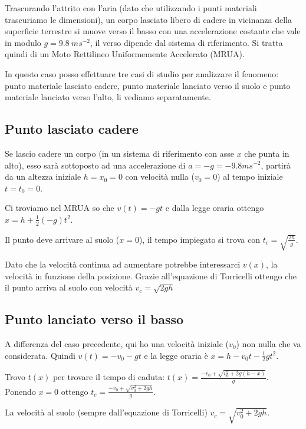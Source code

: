 \documentclass[class=book, crop=false, oneside, 12pt]{standalone}
\begin{document}
Trascurando l'attrito con l'aria (dato che utilizzando i punti materiali
trascuriamo le dimensioni), un corpo lasciato libero di cadere in
vicinanza della superficie terrestre si muove verso il basso con una
accelerazione costante che vale in modulo \(g = 9.8 \ ms^{-2}\), il
verso dipende dal sistema di riferimento. Si tratta quindi di un Moto
Rettilineo Uniformemente Accelerato (MRUA).

In questo caso posso effettuare tre casi di studio per analizzare il
fenomeno: punto materiale lasciato cadere, punto materiale lanciato
verso il suolo e punto materiale lanciato verso l'alto, li vediamo
separatamente.

\subsection{Punto lasciato cadere}

Se lascio cadere un corpo (in un sistema di riferimento con asse \(x\)
che punta in alto), esso sarà sottoposto ad una accelerazione di
\(a = -g = -9.8 ms^{-2}\), partirà da un altezza iniziale
\(h = x_0 = 0\) con velocità nulla (\(v_0 = 0\)) al tempo iniziale
\(t = t_0  = 0\).

Ci troviamo nel MRUA so che \(v(t) = -gt\) e dalla legge oraria ottengo
\(x = h + \frac {1} {2} (-g)t^2\).

Il punto deve arrivare al suolo (\(x=0\)), il tempo impiegato si trova
con \(t_c = \sqrt {\frac {2h} {g}}\).

Dato che la velocità continua ad aumentare potrebbe interessarci
\(v(x)\), la velocità in funzione della posizione. Grazie all'equazione
di Torricelli ottengo che il punto arriva al suolo con velocità
\(v_c = \sqrt {2gh}\)

\subsection{Punto lanciato verso il basso}

A differenza del caso precedente, qui ho una velocità iniziale (\(v_0\))
non nulla che va considerata. Quindi \(v(t) = -v_0 -gt\) e la legge
oraria è \(x = h - v_0t - \frac {1} {2 } gt^2\).

Trovo \(t(x)\) per trovare il tempo di caduta:
\(t(x) = \frac {-v_0 + \sqrt {v_0^2 + 2g (h-x)}} {g}\). Ponendo \(x=0\)
ottengo \(t_c = \frac {-v_0 + \sqrt {v_0^2 + 2g h}} {g}\).

La velocità al suolo (sempre dall'equazione di Torricelli)
\(v_c = \sqrt {v_0^2 + 2gh}\).
\end{document}
